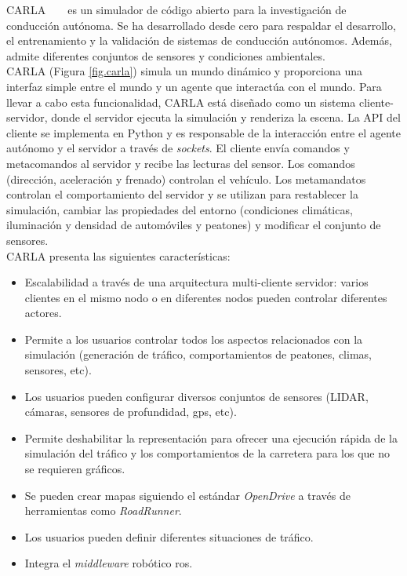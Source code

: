 CARLA ~\cite{carla} ~\cite{carla-org} es un simulador de código abierto para la investigación de conducción autónoma. Se ha desarrollado desde cero para respaldar el desarrollo, el entrenamiento y la validación de sistemas de conducción autónomos. Además, admite diferentes conjuntos de sensores y condiciones ambientales.\\

CARLA (Figura \ref{fig.carla}) simula un mundo dinámico y proporciona una interfaz simple entre el mundo y un agente que interactúa con el mundo. Para llevar a cabo esta funcionalidad, CARLA está diseñado como un sistema cliente-servidor, donde el servidor ejecuta la simulación y renderiza la escena. La API del cliente se implementa en Python y es responsable de la interacción entre el agente autónomo y el servidor a través de \textit{sockets}. El cliente envía comandos y metacomandos al servidor y recibe las lecturas del sensor. Los comandos (dirección, aceleración y frenado) controlan el vehículo. Los metamandatos controlan el comportamiento del servidor y se utilizan para restablecer la simulación, cambiar las propiedades del entorno (condiciones climáticas, iluminación y densidad de automóviles y peatones) y modificar el conjunto de sensores. \\

CARLA presenta las siguientes características:

\begin{itemize}
\item Escalabilidad a través de una arquitectura multi-cliente servidor: varios clientes en el mismo nodo o en diferentes nodos pueden controlar diferentes actores.
\item Permite a los usuarios controlar todos los aspectos relacionados con la simulación (generación de tráfico, comportamientos de peatones, climas, sensores, etc).
\item  Los usuarios pueden configurar diversos conjuntos de sensores (LIDAR, cámaras, sensores de profundidad, \acrshort{gps}, etc).
\item Permite deshabilitar la representación para ofrecer una ejecución rápida de la simulación del tráfico y los comportamientos de la carretera para los que no se requieren gráficos.
\item Se pueden crear mapas siguiendo el estándar \textit{OpenDrive} a través de herramientas como \textit{RoadRunner}.
\item Los usuarios pueden definir diferentes situaciones de tráfico.
\item Integra el \textit{middleware} robótico \acrshort{ros}.
\end{itemize}

